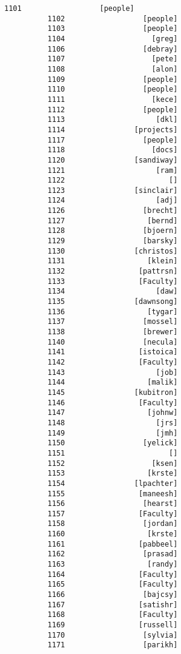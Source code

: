 \documentclass[11pt]{article}
\begin{document}
\begin{Verbatim}[commandchars=\\\{\}]
          1101                  [people]
          1102                  [people]
          1103                  [people]
          1104                    [greg]
          1106                  [debray]
          1107                    [pete]
          1108                    [alon]
          1109                  [people]
          1110                  [people]
          1111                    [kece]
          1112                  [people]
          1113                     [dkl]
          1114                [projects]
          1117                  [people]
          1118                    [docs]
          1120                [sandiway]
          1121                     [ram]
          1122                        []
          1123                [sinclair]
          1124                     [adj]
          1126                  [brecht]
          1127                   [bernd]
          1128                  [bjoern]
          1129                  [barsky]
          1130                [christos]
          1131                   [klein]
          1132                 [pattrsn]
          1133                 [Faculty]
          1134                     [daw]
          1135                [dawnsong]
          1136                   [tygar]
          1137                  [mossel]
          1138                  [brewer]
          1140                  [necula]
          1141                 [istoica]
          1142                 [Faculty]
          1143                     [job]
          1144                   [malik]
          1145                [kubitron]
          1146                 [Faculty]
          1147                   [johnw]
          1148                     [jrs]
          1149                     [jmh]
          1150                  [yelick]
          1151                        []
          1152                    [ksen]
          1153                   [krste]
          1154                [lpachter]
          1155                 [maneesh]
          1156                  [hearst]
          1157                 [Faculty]
          1158                  [jordan]
          1160                   [krste]
          1161                 [pabbeel]
          1162                  [prasad]
          1163                   [randy]
          1164                 [Faculty]
          1165                 [Faculty]
          1166                  [bajcsy]
          1167                 [satishr]
          1168                 [Faculty]
          1169                 [russell]
          1170                  [sylvia]
          1171                  [parikh]

\end{Verbatim}
\end{document}
